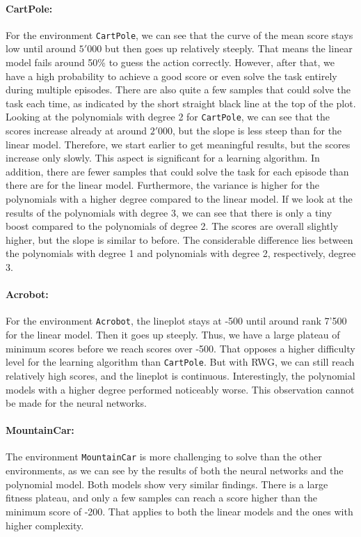 \paragraph*{CartPole:} For the environment \verb|CartPole|, we can see that the curve of the mean score stays low until around $5'000$ but then goes up relatively steeply. That means the linear model fails around 50\% to guess the action correctly. However, after that, we have a high probability to achieve a good score or even solve the task entirely during multiple episodes. There are also quite a few samples that could solve the task each time, as indicated by the short straight black line at the top of the plot. Looking at the polynomials with degree 2 for \verb|CartPole|, we can see that the scores increase already at around $2'000$, but the slope is less steep than for the linear model. Therefore, we start earlier to get meaningful results, but the scores increase only slowly. This aspect is significant for a learning algorithm. In addition, there are fewer samples that could solve the task for each episode than there are for the linear model. Furthermore, the variance is higher for the polynomials with a higher degree compared to the linear model. If we look at the results of the polynomials with degree 3, we can see that there is only a tiny boost compared to the polynomials of degree 2. The scores are overall slightly higher, but the slope is similar to before. The considerable difference lies between the polynomials with degree 1 and polynomials with degree 2, respectively, degree 3.

\paragraph*{Acrobot:} For the environment \verb|Acrobot|, the lineplot stays at -500 until around rank 7'500 for the linear model. Then it goes up steeply. Thus, we have a large plateau of minimum scores before we reach scores over -500. That opposes a higher difficulty level for the learning algorithm than \verb|CartPole|. But with RWG, we can still reach relatively high scores, and the lineplot is continuous. Interestingly, the polynomial models with a higher degree performed noticeably worse. This observation cannot be made for the neural networks.

\paragraph*{MountainCar:} The environment \verb|MountainCar| is more challenging to solve than the other environments, as we can see by the results of both the neural networks and the polynomial model. Both models show very similar findings. There is a large fitness plateau, and only a few samples can reach a score higher than the minimum score of -200. That applies to both the linear models and the ones with higher complexity.

